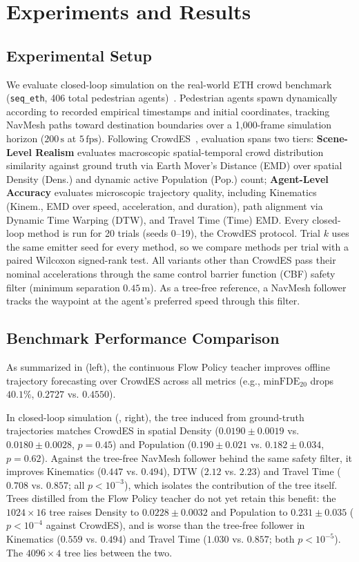 \documentclass{sice-si}
\begin{document}
\section{Experiments and Results}
\subsection{Experimental Setup}
We evaluate closed-loop simulation on the real-world ETH crowd benchmark (\texttt{seq\_eth}, 406 total pedestrian agents)~\cite{bae2025crowdes}. Pedestrian agents spawn dynamically according to recorded empirical timestamps and initial coordinates, tracking NavMesh paths toward destination boundaries over a 1,000-frame simulation horizon ($200\,\text{s}$ at $5\,\text{fps}$). Following CrowdES~\cite{bae2025crowdes}, evaluation spans two tiers: \textbf{Scene-Level Realism} evaluates macroscopic spatial-temporal crowd distribution similarity against ground truth via Earth Mover's Distance (EMD) over spatial Density (Dens.) and dynamic active Population (Pop.) count; \textbf{Agent-Level Accuracy} evaluates microscopic trajectory quality, including Kinematics (Kinem., EMD over speed, acceleration, and duration), path alignment via Dynamic Time Warping (DTW), and Travel Time (Time) EMD.
Every closed-loop method is run for 20 trials (seeds 0--19), the CrowdES protocol. Trial $k$ uses the same emitter seed for every method, so we compare methods per trial with a paired Wilcoxon signed-rank test. All variants other than CrowdES pass their nominal accelerations through the same control barrier function (CBF) safety filter (minimum separation $0.45\,\text{m}$). As a tree-free reference, a NavMesh follower tracks the waypoint at the agent's preferred speed through this filter.

\subsection{Benchmark Performance Comparison}
As summarized in  (left), the continuous Flow Policy teacher improves offline trajectory forecasting over CrowdES across all metrics (e.g., $\text{minFDE}_{20}$ drops $40.1\%$, $0.2727$ vs. $0.4550$). 

In closed-loop simulation (, right), the tree induced from ground-truth trajectories matches CrowdES in spatial Density ($0.0190 \pm 0.0019$ vs. $0.0180 \pm 0.0028$, $p = 0.45$) and Population ($0.190 \pm 0.021$ vs. $0.182 \pm 0.034$, $p = 0.62$). Against the tree-free NavMesh follower behind the same safety filter, it improves Kinematics ($0.447$ vs. $0.494$), DTW ($2.12$ vs. $2.23$) and Travel Time ($0.708$ vs. $0.857$; all $p < 10^{-3}$), which isolates the contribution of the tree itself. Trees distilled from the Flow Policy teacher do not yet retain this benefit: the $1024 \times 16$ tree raises Density to $0.0228 \pm 0.0032$ and Population to $0.231 \pm 0.035$ ($p < 10^{-4}$ against CrowdES), and is worse than the tree-free follower in Kinematics ($0.559$ vs. $0.494$) and Travel Time ($1.030$ vs. $0.857$; both $p < 10^{-5}$). The $4096 \times 4$ tree lies between the two.
\end{document}
